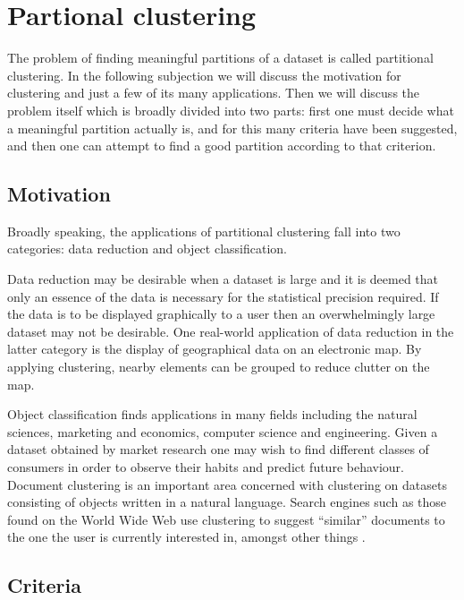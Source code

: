 \documentclass[a4paper]{report}
\begin{document}
\section{Partional clustering}
\label{sec:part-clust-algor}

The problem of finding meaningful partitions of a dataset is called
partitional clustering.  In the following subjection we will discuss the
motivation for clustering and just a few of its many applications.  Then we
will discuss the problem itself which is broadly divided into two parts: first
one must decide what a meaningful partition actually is, and for this many
criteria have been suggested, and then one can attempt to find a good
partition according to that criterion.

\subsection{Motivation}
\label{sec:part-clus-motivation}

Broadly speaking, the applications of partitional clustering fall into two
categories: data reduction and object classification.

Data reduction may be desirable when a dataset is large and it is deemed that
only an essence of the data is necessary for the statistical precision
required.  If the data is to be displayed graphically to a user then an
overwhelmingly large dataset may not be desirable.  One real-world application
of data reduction in the latter category is the display of geographical data
on an electronic map.  By applying clustering, nearby elements can be grouped
to reduce clutter on the map.

Object classification finds applications in many fields including the natural
sciences, marketing and economics, computer science and engineering.  Given a
dataset obtained by market research one may wish to find different classes of
consumers in order to observe their habits and predict future behaviour.
Document clustering is an important area concerned with clustering on datasets
consisting of objects written in a natural language.  Search engines such as
those found on the World Wide Web use clustering to suggest ``similar''
documents to the one the user is currently interested in, amongst other things
\citep{steinbach2000comparison}.

\subsection{Criteria}
\label{sec:criteria}
\end{document}
